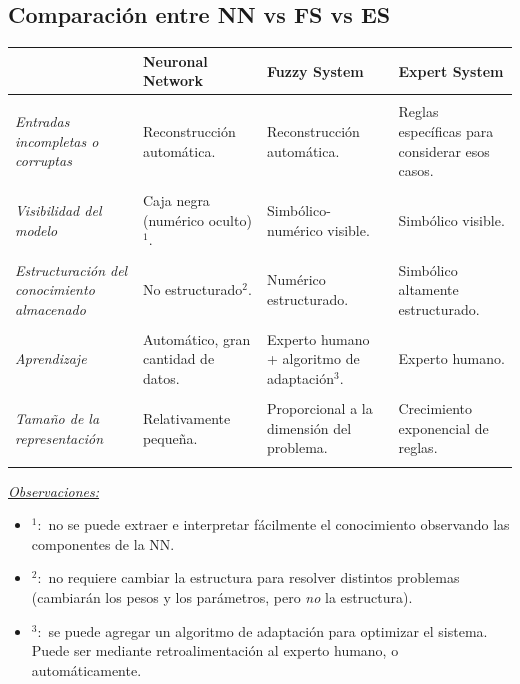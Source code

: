 \documentclass[10pt,a4paper]{article}
\begin{document}
\subsection{Comparación entre NN vs FS vs ES}

\begin{tabular}{p{3cm}p{3.6cm}p{3.6cm}p{3.6cm}}
{\bf } & {\bf Neuronal Network} & {\bf Fuzzy System} & {\bf Expert System}
\\ \hline \\ [-1.5ex]
\textit{Entradas incompletas o corruptas}
& Reconstrucción automática.
& Reconstrucción automática.
& Reglas específicas para considerar esos casos.
\\ [1ex] \hline \\ [-1.5ex]
\textit{Visibilidad del modelo}
& Caja negra (numérico oculto)$^1$.
& Simbólico-numérico visible.
& Simbólico visible.
\\ [1ex] \hline \\ [-1.5ex]
\textit{Estructuración del conocimiento almacenado}
& No estructurado$^2$.
& Numérico estructurado.
& Simbólico altamente estructurado.
\\ [1ex] \hline \\ [-1.5ex]
\textit{Aprendizaje}
& Automático, gran cantidad de datos.
& Experto humano + algoritmo de adaptación$^3$.
& Experto humano.
\\ [1ex] \hline \\ [-1.5ex]
\textit{Tamaño de la representación}
& Relativamente pequeña.
& Proporcional a la dimensión del problema.
& Crecimiento exponencial de reglas.
\\ [1ex] \hline \\ [-1.5ex]
\end{tabular}

\underline{\textit{Observaciones:}}
\begin{itemize}
\item $^1:$ no se puede extraer e interpretar fácilmente el conocimiento observando las componentes de la NN.
\item $^2:$ no requiere cambiar la estructura para resolver distintos problemas (cambiarán los pesos y los parámetros, pero \textit{no} la estructura).
\item $^3:$ se puede agregar un algoritmo de adaptación para optimizar el sistema. Puede ser mediante retroalimentación al experto humano, o automáticamente.
\end{itemize}
\end{document}

